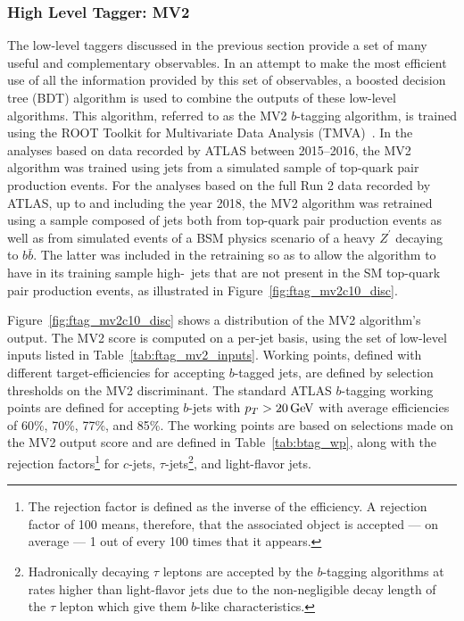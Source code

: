 \subsubsection{High Level Tagger: MV2}
\label{sec:ftag_high_level}

The low-level taggers discussed in the previous section provide a set of many useful and complementary observables.
In an attempt to make the most efficient use of all the information provided by this set of observables,
a boosted decision tree (BDT) algorithm is used to combine the outputs of these low-level algorithms.
This algorithm, referred to as the MV2 $b$-tagging algorithm, is trained using the ROOT Toolkit for Multivariate
Data Analysis (TMVA)~\cite{TMVA}.
In the analyses based on data recorded by ATLAS between 2015--2016, the MV2 algorithm was trained using jets from
a simulated sample of top-quark pair production events.
For the analyses based on the full Run 2 data recorded by ATLAS, up to and including the year 2018, the MV2
algorithm was retrained using a sample composed of jets both from top-quark
pair production events as well as from simulated events of a BSM physics scenario of a heavy $Z^{\prime}$ decaying to $b\bar{b}$.
The latter was included in the retraining so as to allow the algorithm to have in its training sample
high-\pT~jets that are not present in the SM top-quark pair production events, as illustrated in Figure~\ref{fig:ftag_mv2c10_disc}.

Figure~\ref{fig:ftag_mv2c10_disc} shows a distribution of the MV2 algorithm's output.
The MV2 score is computed on a per-jet basis, using the set of low-level inputs listed in Table~\ref{tab:ftag_mv2_inputs}.
Working points, defined with different target-efficiencies for accepting $b$-tagged jets, are defined
by selection thresholds on the MV2 discriminant.
The standard ATLAS $b$-tagging working points are defined for accepting $b$-jets with $p_{T}>20\,\text{Ge\kern -0.1em V}$ with
average efficiencies of 60\%, 70\%, 77\%, and 85\%. 
The working points are based on selections made on the MV2 output score and are defined in Table~\ref{tab:btag_wp}, along with the rejection factors\footnote{The rejection factor
is defined as the inverse of the efficiency. A rejection factor of 100 means, therefore, that the associated
object is accepted --- on average --- 1 out of every 100 times that it appears.}
for $c$-jets, $\tau$-jets\footnote{Hadronically decaying $\tau$ leptons are accepted by the $b$-tagging algorithms
at rates higher than light-flavor jets due to the non-negligible decay length of the $\tau$ lepton which give them $b$-like
characteristics.},
and light-flavor jets.



